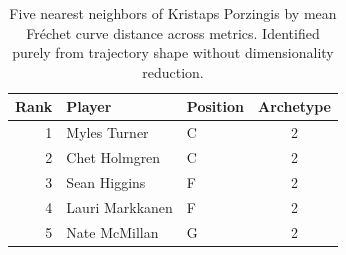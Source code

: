 \begin{table}[htbp]
  \centering\small
  \begin{tabular}{rllc}
    \toprule
    Rank & Player & Position & Archetype \\
    \midrule
    1 & Myles Turner & C & 2 \\
    2 & Chet Holmgren & C & 2 \\
    3 & Sean Higgins & F & 2 \\
    4 & Lauri Markkanen & F & 2 \\
    5 & Nate McMillan & G & 2 \\
    \bottomrule
  \end{tabular}
  \caption{Five nearest neighbors of Kristaps Porzingis by mean Fr\'{e}chet curve distance across metrics. Identified purely from trajectory shape without dimensionality reduction.}
  \label{tab:Kristaps_Porzingis_frechet_curve_neighbors}
\end{table}

